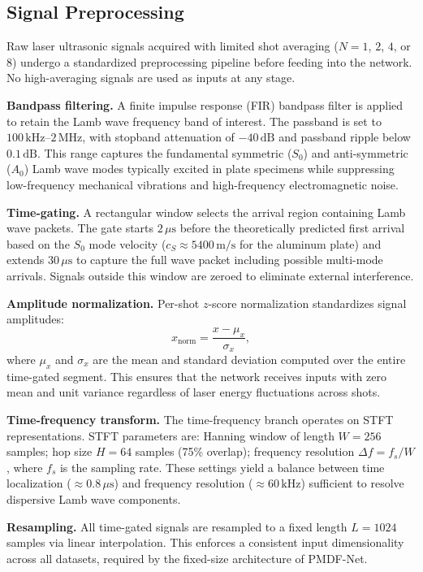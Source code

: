 \subsection{Signal Preprocessing}
\label{sec:preprocessing}

Raw laser ultrasonic signals acquired with limited shot averaging ($N = 1$, $2$, $4$, or $8$) undergo a standardized preprocessing pipeline before feeding into the network. No high-averaging signals are used as inputs at any stage.

\textbf{Bandpass filtering.} A finite impulse response (FIR) bandpass filter is applied to retain the Lamb wave frequency band of interest. The passband is set to $100\,\text{kHz}$--$2\,\text{MHz}$, with stopband attenuation of $-40\,\text{dB}$ and passband ripple below $0.1\,\text{dB}$. This range captures the fundamental symmetric ($S_0$) and anti-symmetric ($A_0$) Lamb wave modes typically excited in plate specimens while suppressing low-frequency mechanical vibrations and high-frequency electromagnetic noise.

\textbf{Time-gating.} A rectangular window selects the arrival region containing Lamb wave packets. The gate starts $2\,\mu\text{s}$ before the theoretically predicted first arrival based on the $S_0$ mode velocity ($c_S \approx 5400\,\text{m/s}$ for the aluminum plate) and extends $30\,\mu\text{s}$ to capture the full wave packet including possible multi-mode arrivals. Signals outside this window are zeroed to eliminate external interference.

\textbf{Amplitude normalization.} Per-shot $z$-score normalization standardizes signal amplitudes:
\begin{equation}
x_{\text{norm}} = \frac{x - \mu_x}{\sigma_x},
\end{equation}
where $\mu_x$ and $\sigma_x$ are the mean and standard deviation computed over the entire time-gated segment. This ensures that the network receives inputs with zero mean and unit variance regardless of laser energy fluctuations across shots.

\textbf{Time-frequency transform.} The time-frequency branch operates on STFT representations. STFT parameters are: Hanning window of length $W = 256$ samples; hop size $H = 64$ samples (75\% overlap); frequency resolution $\Delta f = f_s / W$, where $f_s$ is the sampling rate. These settings yield a balance between time localization ($\approx 0.8\,\mu\text{s}$) and frequency resolution ($\approx 60\,\text{kHz}$) sufficient to resolve dispersive Lamb wave components.

\textbf{Resampling.} All time-gated signals are resampled to a fixed length $L = 1024$ samples via linear interpolation. This enforces a consistent input dimensionality across all datasets, required by the fixed-size architecture of PMDF-Net.